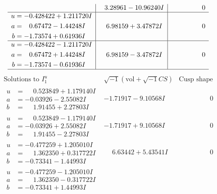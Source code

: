 \documentclass[1p]{elsarticle_modified}
\theoremstyle{definition}
\newcommand{\I}{\sqrt{-1}}
\begin{document}
$$\begin{array}{c|c|c}
 & \phantom{-}3.28961 - 10.96240 I & \phantom{-0.000000 } 0 \\ \hline\begin{aligned}
u &= -0.428422 + 1.211720 I \\
a &= \phantom{-}0.67472 - 1.44248 I \\
b &= -1.73574 + 0.61936 I\end{aligned}
 & \phantom{-}6.98159 + 3.47872 I & \phantom{-0.000000 } 0 \\ \hline\begin{aligned}
u &= -0.428422 - 1.211720 I \\
a &= \phantom{-}0.67472 + 1.44248 I \\
b &= -1.73574 - 0.61936 I\end{aligned}
 & \phantom{-}6.98159 - 3.47872 I & \phantom{-0.000000 } 0\\
 \hline 
 \end{array}$$\newpage$$\begin{array}{c|c|c}  
\text{Solutions to }I^u_{1}& \I (\text{vol} + \sqrt{-1}CS) & \text{Cusp shape}\\
 \hline 
\begin{aligned}
u &= \phantom{-}0.523849 + 1.179140 I \\
a &= -0.03926 - 2.55082 I \\
b &= \phantom{-}1.91455 + 2.27803 I\end{aligned}
 & -1.71917 - 9.10568 I & \phantom{-0.000000 } 0 \\ \hline\begin{aligned}
u &= \phantom{-}0.523849 - 1.179140 I \\
a &= -0.03926 + 2.55082 I \\
b &= \phantom{-}1.91455 - 2.27803 I\end{aligned}
 & -1.71917 + 9.10568 I & \phantom{-0.000000 } 0 \\ \hline\begin{aligned}
u &= -0.477259 + 1.205010 I \\
a &= \phantom{-}1.362350 + 0.317722 I \\
b &= -0.73341 - 1.44993 I\end{aligned}
 & \phantom{-}6.63442 + 5.43541 I & \phantom{-0.000000 } 0 \\ \hline\begin{aligned}
u &= -0.477259 - 1.205010 I \\
a &= \phantom{-}1.362350 - 0.317722 I \\
b &= -0.73341 + 1.44993 I\end{aligned}

\end{array}$$
\end{document}
